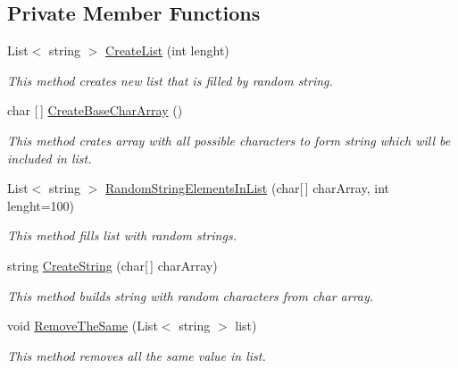 \subsection*{Private Member Functions}
\begin{DoxyCompactItemize}
\item 
List$<$ string $>$ \mbox{\hyperlink{class_home_work_1_1_task_library_1_1_tasks_1_1_lesson7_1_1_task4_ac6946078bd7a7a9d87213d1dfe6e3fec}{Create\+List}} (int lenght)
\begin{DoxyCompactList}\small\item\em This method creates new list that is filled by random string. \end{DoxyCompactList}\item 
char \mbox{[}$\,$\mbox{]} \mbox{\hyperlink{class_home_work_1_1_task_library_1_1_tasks_1_1_lesson7_1_1_task4_a4765a8b3613eaa42247fc911cb2484af}{Create\+Base\+Char\+Array}} ()
\begin{DoxyCompactList}\small\item\em This method crates array with all possible characters to form string which will be included in list. \end{DoxyCompactList}\item 
List$<$ string $>$ \mbox{\hyperlink{class_home_work_1_1_task_library_1_1_tasks_1_1_lesson7_1_1_task4_aec6c0e6c062d5eec7f9196b86ceeb481}{Random\+String\+Elements\+In\+List}} (char\mbox{[}$\,$\mbox{]} char\+Array, int lenght=100)
\begin{DoxyCompactList}\small\item\em This method fills list with random strings. \end{DoxyCompactList}\item 
string \mbox{\hyperlink{class_home_work_1_1_task_library_1_1_tasks_1_1_lesson7_1_1_task4_add270978e9d09fbe99016bb8a6d6775e}{Create\+String}} (char\mbox{[}$\,$\mbox{]} char\+Array)
\begin{DoxyCompactList}\small\item\em This method builds string with random characters from char array. \end{DoxyCompactList}\item 
void \mbox{\hyperlink{class_home_work_1_1_task_library_1_1_tasks_1_1_lesson7_1_1_task4_abf0a4257cf2f98a9f6e26fe83eb50a28}{Remove\+The\+Same}} (List$<$ string $>$ list)
\begin{DoxyCompactList}\small\item\em This method removes all the same value in list. \end{DoxyCompactList}\item 

\end{DoxyCompactItemize}
